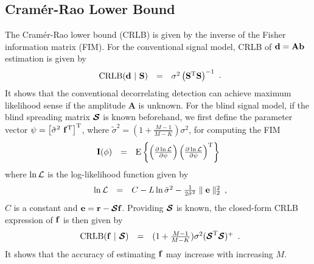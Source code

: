 \documentclass[conference]{IEEEtran}
\newcommand{\br}{{\mathbf r}}
\newcommand{\bA}{{\mathbf A}}
\newcommand{\bb}{{\bf b}}
\newcommand{\bd}{{\bf d}}
\newcommand{\bbf}{{\bf f}}
\newcommand{\bS}{{\bf S}}
\newcommand{\bI}{{\bf I}}
\newcommand{\bcS}{{\mbox {\boldmath ${\cal S}$}}}
\begin{document}
\subsection{Cram\'{e}r-Rao Lower Bound} The Cram\'{e}r-Rao lower
bound (CRLB) is given by the inverse of the Fisher information
matrix (FIM). For the conventional signal model, CRLB of
$\bd=\bA\bb$ estimation is given by
\begin{equation}
\begin{array}{rcl}
{\rm CRLB}(\bd\ |\ \bS)&=&\sigma^{2}\left(\bS^{\rm
T}\bS\right)^{\rm -1}
\end{array}.\label{CRLB_b}
\end{equation}
\noindent It shows that the conventional decorrelating detection
can achieve maximum likelihood sense if the amplitude $\bA$ is
unknown. For the blind signal model, if the blind spreading matrix
$\bcS$ is known beforehand, we first define the parameter vector
$\mathbf{\psi} = \left[\tilde{\sigma}^{2}\ \bbf^{\rm
T}\right]^{\rm T}$, where $\tilde{\sigma}^{2}
=(1+\frac{M-1}{M-K})\sigma^{2}$, for computing the FIM
\begin{equation}
\begin{array}{rcl}
{\bI(\mathbf{\phi})} &=& {\rm E} \left\{ \left( \frac{\partial
\ln{\cal L}}{\partial \mathbf{\psi}} \right) \left( \frac{\partial
\ln{\cal L}}{\partial \mathbf{\psi}} \right)^{\rm T} \right\}
\label{fim}
\end{array}
\end{equation}
\noindent where $\ln{\cal L}$ is the log-likelihood function given
by
\begin{equation}
\begin{array}{rcl}
\ln{\cal
L}&=&C-L\ln\tilde{\sigma}^2-\frac{1}{2\tilde{\sigma}^2}\parallel\mathbf{e}\parallel_2^2
\end{array},\label{logl}
\end{equation}
\noindent $C$ is a constant and $\mathbf{e}=\br-\bcS\bbf$.
Providing $\bcS$ is known, the closed-form CRLB expression of
$\bbf$ is then given by
\begin{equation}
\begin{array}{rcl}
{\rm CRLB}(\bbf\ |\
\bcS)&=&(1+\frac{M-1}{M-K})\sigma^{2}(\bcS^{\rm T}\bcS)^{\rm +}
\end{array}.\label{CRLB_f}
\end{equation}
\noindent It shows that the accuracy of estimating $\bbf$ may
increase with increasing $M$.
\end{document}

